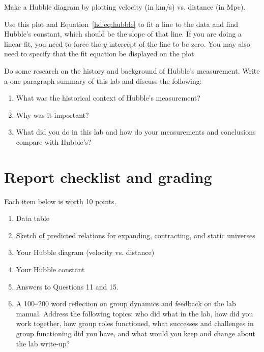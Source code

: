 \begin{steps}
	
	\item Make a Hubble diagram by plotting velocity (in km/s) vs. distance (in Mpc).
	
	\item Use this plot and Equation~\ref{hd:eq:hubble} to fit a line to the data and find Hubble's constant, which should be the slope of that line. If you are doing a linear fit, you need to force the $y$-intercept of the line to be zero. You may also need to specify that the fit equation be displayed on the plot.
	
	\item Do some research on the history and background of Hubble’s
	measurement. Write a one paragraph summary of this lab and discuss
	the following:
	\begin{enumerate}
		\item What was the historical context of Hubble’s measurement?
		\item Why was it important?
		\item What did you do in this lab and how do your measurements and
		conclusions compare with Hubble’s?
	\end{enumerate}
\end{steps}

\section{Report checklist and grading}

Each item below is worth 10 points.

\begin{enumerate}
	\item Data table
	
	\item Sketch of predicted relations for expanding, contracting, and static universes
	
	\item Your Hubble diagram (velocity vs. distance)
	
	\item Your Hubble constant
	
	\item Answers to Questions 11 and 15.
	
	\item A 100--200 word reflection on group dynamics and feedback on the lab manual. Address the following topics: who did what in the lab, how did you work together, how group roles functioned, what successes and challenges in group functioning did you have, and what would you keep and change about the lab write-up?
\end{enumerate}